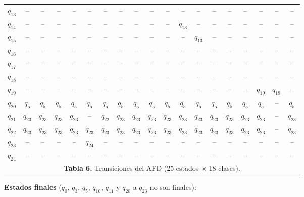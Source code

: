 \documentclass[12pt,letterpaper]{article}
\begin{document}
\begin{table}[H]
{\begin{tabular}{@{}l *{18}{c}@{}}
$q_{13}$ & -- & -- & -- & -- & -- & -- & -- & -- & -- & -- & -- & -- & -- & -- & -- & -- & -- & -- \\
$q_{14}$ & -- & -- & -- & -- & -- & -- & -- & -- & -- & -- & $q_{13}$ & -- & -- & -- & -- & -- & -- & -- \\
$q_{15}$ & -- & -- & -- & -- & -- & -- & -- & -- & -- & -- & -- & $q_{13}$ & -- & -- & -- & -- & -- & -- \\
$q_{16}$ & -- & -- & -- & -- & -- & -- & -- & -- & -- & -- & -- & -- & -- & -- & -- & -- & -- & -- \\
$q_{17}$ & -- & -- & -- & -- & -- & -- & -- & -- & -- & -- & -- & -- & -- & -- & -- & -- & -- & -- \\
$q_{18}$ & -- & -- & -- & -- & -- & -- & -- & -- & -- & -- & -- & -- & -- & -- & -- & -- & -- & -- \\
$q_{19}$ & -- & -- & -- & -- & -- & -- & -- & -- & -- & -- & -- & -- & -- & -- & -- & $q_{19}$ & $q_{19}$ & -- \\
$q_{20}$ & $q_{5}$ & $q_{5}$ & $q_{5}$ & $q_{5}$ & $q_{5}$ & $q_{5}$ & $q_{5}$ & $q_{5}$ & $q_{5}$ & $q_{5}$ & $q_{5}$ & $q_{5}$ & $q_{5}$ & $q_{5}$ & $q_{5}$ & $q_{5}$ & -- & $q_{5}$ \\
$q_{21}$ & $q_{23}$ & $q_{23}$ & $q_{23}$ & $q_{23}$ & -- & $q_{22}$ & $q_{23}$ & $q_{23}$ & $q_{23}$ & $q_{23}$ & $q_{23}$ & $q_{23}$ & $q_{23}$ & $q_{23}$ & $q_{23}$ & $q_{23}$ & -- & $q_{23}$ \\
$q_{22}$ & $q_{23}$ & $q_{23}$ & $q_{23}$ & $q_{23}$ & $q_{23}$ & $q_{23}$ & $q_{23}$ & $q_{23}$ & $q_{23}$ & $q_{23}$ & $q_{23}$ & $q_{23}$ & $q_{23}$ & $q_{23}$ & $q_{23}$ & $q_{23}$ & -- & $q_{23}$ \\
$q_{23}$ & -- & -- & -- & -- & $q_{24}$ & -- & -- & -- & -- & -- & -- & -- & -- & -- & -- & -- & -- & -- \\
$q_{24}$ & -- & -- & -- & -- & -- & -- & -- & -- & -- & -- & -- & -- & -- & -- & -- & -- & -- & -- \\
\bottomrule
\multicolumn{19}{c}{\vspace{2pt}\footnotesize \textbf{Tabla 6.} Transiciones del AFD (25 estados $\times$ 18 clases).} \\
\end{tabular}}
\end{table}

\textbf{Estados finales} ($q_0$, $q_3$, $q_5$, $q_{10}$, $q_{11}$ y $q_{20}$ a $q_{23}$ no son finales):
\end{document}
